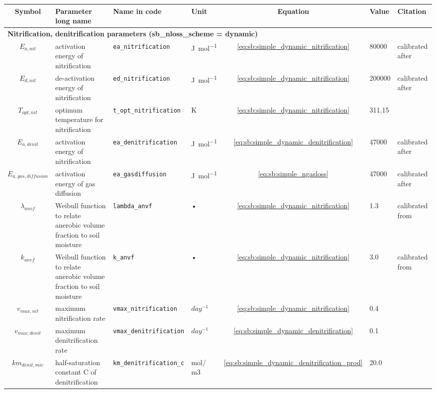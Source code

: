 \begin{table}
\begin{tabularx}{\linewidth}{|c|X|l|l|c|l|X|} %
\hline 
Symbol & Parameter long name & Name in code & Unit & Equation & Value & Citation \\ 
\hline 

\multicolumn{6}{l}{\bf Nitrification, denitrification parameters (sb\_nloss\_scheme = dynamic)}\\
\hline
$E_{a,nit}$ & activation energy of nitrification & \texttt{ea\_nitrification} & \unit{J mol^{-1}} & \ref{eq:sb:simple_dynamic_nitrification} & 80000 & calibrated after \cite{XURI:2008jq} \\
$E_{d,nit}$ & de-activation energy of nitrification & \texttt{ed\_nitrification} & \unit{J mol^{-1}} & \ref{eq:sb:simple_dynamic_nitrification} & 200000 & calibrated after \cite{XURI:2008jq}\\
$T_{opt,nit}$ & optimum temperature for nitrification & \texttt{t\_opt\_nitrification} & K & \ref{eq:sb:simple_dynamic_nitrification} & 311.15 & \cite{XURI:2008jq} \\
$E_{a,denit}$ & activation energy of nitrification & \texttt{ea\_denitrification} & \unit{J mol^{-1}} & \ref{eq:sb:simple_dynamic_denitrification} & 47000 & calibrated after \cite{XURI:2008jq}\\
$E_{a,gas,diffusion}$ & activation energy of gas diffusion & \texttt{ea\_gasdiffusion} & \unit{J mol^{-1}} & \ref{eq:sb:simple_ngasloss} & 47000 & calibrated after \cite{XURI:2008jq}\\
$\lambda_{anvf}$ & Weibull function to relate anerobic volume fraction to soil moisture & \texttt{lambda\_anvf} & • & \ref{eq:sb:simple_dynamic_nitrification} & 1.3 & calibrated from \cite{Zaehle:2010cz} \\
$k_{anvf}$ & Weibull function to relate anerobic volume fraction to soil moisture & \texttt{k\_anvf} & • & \ref{eq:sb:simple_dynamic_nitrification} & 3.0 &  calibrated from \cite{Zaehle:2010cz} \\
$v_{max,nit}$ & maximum nitrification rate & \texttt{vmax\_nitrification} & $day^{-1}$ & \ref{eq:sb:simple_dynamic_nitrification} & 0.4 & \cite{XURI:2008jq} \\
$v_{max,denit}$ & maximum denitrification rate & \texttt{vmax\_denitrification} & $day^{-1}$ & \ref{eq:sb:simple_dynamic_denitrification} & 0.1 & \cite{XURI:2008jq} \\
$km_{denit,mic}$ & half-saturation constant C of denitrification & \texttt{km\_denitrification\_c} & mol/ m3 &  \ref{eq:sb:simple_dynamic_denitrification_prod}  & 20.0 & \cite{XURI:2008jq} \\

\end{tabularx}
\end{table}
